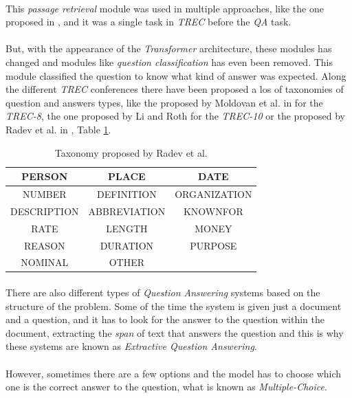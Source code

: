 \paragraph{}
This \emph{passage retrieval} module was used in multiple approaches, like the one proposed in \cite{Pablo-Sanchez}, and it was a single task in \emph{TREC} before the \emph{QA} task. 
\paragraph{}
But, with the appearance of the \emph{Transformer} architecture, these modules has changed and modules like \emph{question classification} has even been removed. This module classified the question to know what kind of answer was expected. Along the different \emph{TREC} conferences there have been proposed a los of taxonomies of question and answers types, like the proposed by Moldovan et al. in \cite{Moldovan2001} for the \emph{TREC-8}, the one proposed by Li and Roth for the \emph{TREC-10}\cite{Li2002} or the proposed by Radev et al. in \cite{Radev2005}, Table \ref{tab:radev}.
\begin{table}
	\centering
	\begin{tabular}{|c|c|c|}
		\hline 
		PERSON & PLACE & DATE \\ 
		\hline 
		NUMBER & DEFINITION & ORGANIZATION \\ 
		\hline 
		DESCRIPTION & ABBREVIATION & KNOWNFOR \\ 
		\hline 
		RATE & LENGTH & MONEY \\ 
		\hline 
		REASON & DURATION & PURPOSE \\ 
		\hline 
		NOMINAL & OTHER &  \\ 
		\hline 
	\end{tabular} 
	\caption{Taxonomy proposed by Radev et al.}
	\label{tab:radev}
\end{table}
\paragraph{}
There are also different types of \emph{Question Answering} systems based on the structure of the problem. Some of the time the system is given just a document and a question, and it has to look for the answer to the question within the document, extracting the \emph{span} of text that answers the question and this is why these systems are known as \emph{Extractive Question Answering}. 
\paragraph{}
However, sometimes there are a few options and the model has to choose which one is the correct answer to the question, what is known as \emph{Multiple-Choice}.
